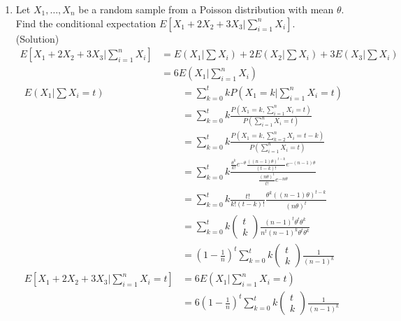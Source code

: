 \documentclass{oblivoir}
\newcommand{\mat}[2]{\begin{pmatrix} #1 \\ #2 \end{pmatrix}}
\newcommand{\flr}[1]{\left ( #1 \right )}
\newcommand{\blue}[1]{{\color{blue} #1}}
\begin{document}
\begin{enumerate}
\vspace{5mm}
\item 
Let $X_1, \ldots, X_n$ be a random sample from a Poisson distribution with mean $\theta$. Find the conditional expectation 
$E[X_1 + 2X_2 + 3X_3| \sum_{i=1}^n X_i]$. \\
\blue{(Solution)}
\begin{align*}
E[X_1 + 2X_2 + 3X_3| \sum_{i=1}^n X_i] &= E(X_1|\sum X_i) + 2E(X_2|\sum X_i) + 3E(X_3|\sum X_i)\\
&= 6 E(X_1 | \sum_{i=1}^n X_i)
\end{align*}
\begin{align*}
E(X_1|\sum X_i = t) &= \sum_{k=0}^t k P(X_1 = k | \sum_{i=1}^n X_i = t) \\
&=  \sum_{k=0}^t k \frac{P(X_1 = k , \sum_{i=1}^n X_i = t)}{P(\sum_{i=1}^n X_i = t)} \\
&= \sum_{k=0}^t k \frac{P(X_1 = k , \sum_{k=2}^n X_i = t - k)}{P(\sum_{i=1}^n X_i = t)} \\
&= \sum_{k=0}^t k \frac{\frac{\theta^k}{k!} e^{-\theta} \frac{((n-1)\theta)^{t-k}}{(t-k)!} e^{-(n-1)\theta}}{\frac{(n\theta)^t}{t!} e^{-n\theta}} \\
&= \sum_{k=0}^t k \frac{t!}{k!(t-k)!} \frac{\theta^k((n-1)\theta)^{t-k}}{(n\theta)^t} \\
&= \sum_{k=0}^t k \mat{t}{k} \frac{(n-1)^t \theta^t \theta^k}{n^t (n-1)^k \theta^t \theta^k} \\
&= \flr{ 1- \frac{1}{n}}^t \sum_{k=0}^t k \mat{t}{k} \frac{1}{(n-1)^k} \\
E[X_1 + 2X_2 + 3X_3| \sum_{i=1}^n X_i = t] &= 6 E(X_1 | \sum_{i=1}^n X_i = t) \\
&= 6 \flr{ 1- \frac{1}{n}}^t \sum_{k=0}^t k \mat{t}{k} \frac{1}{(n-1)^k} \\
\end{align*}


\end{enumerate}
\end{document}
